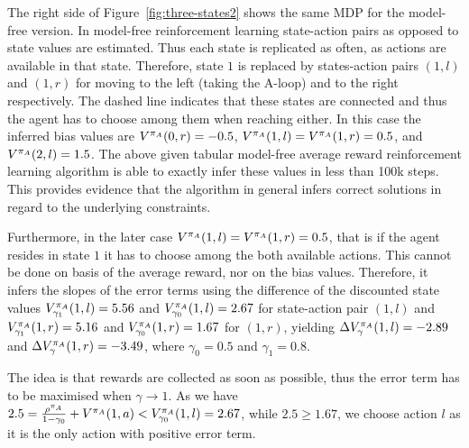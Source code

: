 \documentclass[envcountsame]{llncs}
\newcommand\MS[2][r]{\ifx t#1 \textcolor{blue}{[\textbf{MS:} #2]}
  \else \begin{center}\textcolor{blue}{\textbf{MS:} #2} \end{center} \fi}
\begin{document}
The right side of Figure~\ref{fig:three-states2} shows the same MDP for the model-free version. In
model-free reinforcement learning state-action pairs as opposed to state values are estimated. Thus
each state is replicated as often, as actions are available in that state. Therefore, state \(1\) is
replaced by states-action pairs \((1,l)\) and \((1,r)\) for moving to the left (taking the A-loop)
and to the right respectively. The dashed line indicates that these states are connected and thus
the agent has to choose among them when reaching either. In this case the inferred bias values are
\(V^{\pi_{A}}(0,r) = -0.5\), \(V^{\pi_{A}}(1,l)=V^{\pi_{A}}(1,r)=0.5\), and \(V^{\pi_{A}}(2,l)=1.5\). The above given tabular model-free
average reward reinforcement learning algorithm is able to exactly infer these values in less than
100k steps. This provides evidence that the algorithm in general infers correct solutions in regard to
the underlying constraints.


Furthermore, in the later case \(V^{\pi_{A}}(1,l)=V^{\pi_{A}}(1,r)=0.5\), that is if the agent
resides in state \(1\) it has to choose among the both available actions. This cannot be done on
basis of the average reward, nor on the bias values. Therefore, it infers the slopes of the error
terms using the difference of the discounted state values \(V^{\pi_{A}}_{\gamma_{1}}(1,l) = 5.56\)
and \(V^{\pi_{A}}_{\gamma_{0}}(1,l) = 2.67\) for state-action pair \((1,l)\) and
\(V^{\pi_{A}}_{\gamma_{1}}(1,r) = 5.16\) and \(V^{\pi_{A}}_{\gamma_{0}}(1,r) = 1.67\) for
\((1,r)\), yielding \(\Delta V^{\pi_{A}}_\gamma(1,l) = -2.89\) and
\(\Delta V^{\pi_{A}}_\gamma(1,r) = -3.49\), where \(\gamma_{0} = 0.5\) and \(\gamma_{1}=0.8\).

The idea is that rewards are collected as soon as possible, thus the error term has to be maximised
when \(\gamma \to 1\). As we have
\(2.5 = \frac{\rho^{\pi_{A}}}{1-\gamma_{0}} + V^{\pi_{A}}(1,a) < V^{\pi_{A}}_{\gamma_{0}}(1,l)
= 2.67\), while \(2.5 \geqslant 1.67\), we choose action \(l\) as it is the only action with
positive error term.
\end{document}
